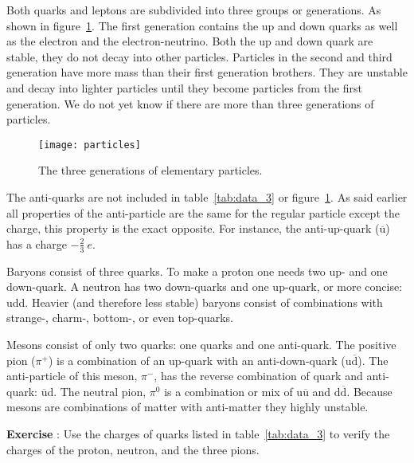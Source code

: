 \vspace{0.5cm}

Both quarks and leptons are subdivided into three groups or generations. As shown in figure~\ref{fig:particles}. The first generation contains the up and down quarks as well as the electron and the electron-neutrino. Both the up and down quark are stable, they do not decay into other particles. Particles in the second and third generation have more mass than their first generation brothers. They are unstable and decay into lighter particles until they become particles from the first generation. We do not yet know if there are more than three generations of particles.

\begin{figure}[h]\begin{center}
\texttt{[image: particles]}%
\caption{The three generations of elementary particles.\protect\footnotemark}\label{fig:particles}
\end{center}\end{figure}

The anti-quarks are not included in table~\ref{tab:data_3} or figure~\ref{fig:particles}. As said earlier all properties of the anti-particle are the same for the regular particle except the charge, this property is the exact opposite. For instance, the anti-up-quark ($\overline{\mbox{u}}$) has a charge $-\frac{2}{3}~e$.

Baryons consist of three quarks. To make a proton one needs two up- and one down-quark. A neutron has two down-quarks and one up-quark, or more concise: udd. Heavier (and therefore less stable) baryons consist of combinations with strange-, charm-, bottom-, or even top-quarks.

Mesons consist of only two quarks: one quarks and one anti-quark. The positive pion ($\pi^+$) is a combination of an up-quark with an anti-down-quark (u$\overline{\mbox{d}}$). The anti-particle of this meson, $\pi^-$, has the reverse combination of quark and anti-quark: $\overline{\mbox{u}}$d. The neutral pion, $\pi^0$ is a combination or mix of u$\overline{\mbox{u}}$ and d$\overline{\mbox{d}}$. Because mesons are combinations of matter with anti-matter they highly unstable. 

\begin{shaded}
\textbf{Exercise \theExercise {}} : Use the charges of quarks listed in table~\ref{tab:data_3} to verify the charges of the proton, neutron, and the three pions.\end{shaded}

